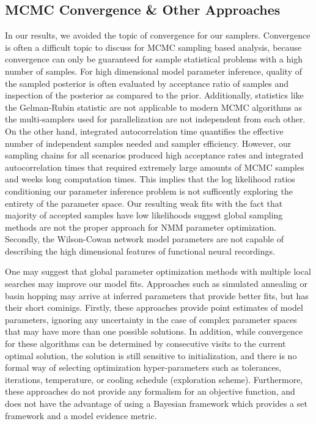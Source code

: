 \subsection{MCMC Convergence \& Other Approaches}
In our results, we avoided the topic of convergence for our samplers. Convergence is often a difficult topic to discuss for MCMC sampling based analysis, because convergence can only be guaranteed for sample statistical problems with a high number of samples. For high dimensional model parameter inference, quality of the sampled posterior is often evaluated by acceptance ratio of samples and inspection of the posterior as compared to the prior. Additionally, statistics like the Gelman-Rubin statistic \cite{gelman_inference_1992} are not applicable to modern MCMC algorithms as the multi-samplers used for parallelization are not independent from each other. On the other hand, integrated autocorrelation time \cite{goodman_ensemble_2010} quantifies the effective number of independent samples needed and sampler efficiency. However, our sampling chains for all scenarios produced high acceptance rates and integrated autocorrelation times that required extremely large amounts of MCMC samples and weeks long computation times. This implies that the log likelihood ratios conditioning our parameter inference problem is not sufficently exploring the entirety of the parameter space. Our resulting weak fits with the fact that majority of accepted samples have low likelihoods suggest global sampling methods are not the proper approach for NMM parameter optimization. Secondly, the Wilson-Cowan network model parameters are not capable of describing the high dimensional features of functional neural recordings.

One may suggest that global parameter optimization methods with multiple local searches may improve our model fits. Approaches such as simulated annealing \cite{Kirkpatrick1983} or basin hopping \cite{Wales1997} may arrive at inferred parameters that provide better fits, but has their short cominigs. Firstly, these approaches provide point estimates of model parameters, ignoring any uncertainty in the case of complex parameter spaces that may have more than one possible solutions. In addition, while convergence for these algorithms can be determined by consecutive visits to the current  optimal solution, the solution is still sensitive to initialization, and there is no formal way of selecting optimization hyper-parameters such as tolerances, iterations, temperature, or cooling schedule (exploration scheme). Furthermore, these approaches do not provide any formalism for an objective function, and does not have the advantage of using a Bayesian framework which provides a set framework and a model evidence metric. 


